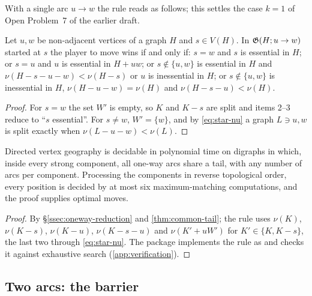 With a single arc $u\to w$ the rule reads as follows; this settles the case $k=1$ of Open Problem~7 of the earlier draft.

\begin{corollary}\label{cor:one-arc}
Let $u,w$ be non-adjacent vertices of a graph $H$ and $s\in V(H)$. In $\mathfrak{G}(H;u\to w)$ started at $s$ the player to move wins if and only if: $s=w$ and $s$ is essential in $H$; or $s=u$ and $u$ is essential in $H+uw$; or $s\notin\{u,w\}$ is essential in $H$ and $\nu(H-s-u-w)<\nu(H-s)$ or $u$ is inessential in $H$; or $s\notin\{u,w\}$ is inessential in $H$, $\nu(H-u-w)=\nu(H)$ and $\nu(H-s-u)<\nu(H)$.
\end{corollary}
\begin{proof}
For $s=w$ the set $W'$ is empty, so $K$ and $K-s$ are split and items 2--3 reduce to ``$s$ essential''. For $s\neq w$, $W'=\{w\}$, and by \eqref{eq:star-nu} a graph $L\ni u,w$ is split exactly when $\nu(L-u-w)<\nu(L)$.
\end{proof}

\begin{corollary}\label{cor:star-dvg}
Directed vertex geography is decidable in polynomial time on digraphs in which, inside every strong component, all one-way arcs share a tail, with any number of arcs per component. Processing the components in reverse topological order, every position is decided by at most six maximum-matching computations, and the proof supplies optimal moves.
\end{corollary}
\begin{proof}
By \S\ref{ssec:oneway-reduction} and \cref{thm:common-tail}; the rule uses $\nu(K)$, $\nu(K-s)$, $\nu(K-u)$, $\nu(K-s-u)$ and $\nu(K'+uW')$ for $K'\in\{K,K-s\}$, the last two through \eqref{eq:star-nu}. The package implements the rule as  and checks it against exhaustive search (\cref{app:verification}).
\end{proof}

\subsection{Two arcs: the barrier}

